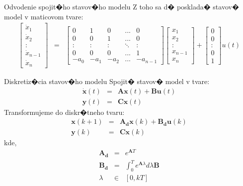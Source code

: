\documentclass{beamer}
\renewcommand{\vec}[1]{\boldsymbol{#1}} %
\begin{document}
\begin{frame}{Odvodenie spojit�ho stavov�ho modelu}
Z toho sa d� posklada� stavov� model v maticovom tvare:
\begin{eqnarray*}
\begin{bmatrix}
\dot{x}_{1}\\\dot{x}_{2}\\\colon \\ \dot{x}_{n-1}\\ \dot{x}_{n}
\end{bmatrix}
&=&
\begin{bmatrix}
0 & 1 & 0 & ... &  0 \\
0 & 0 & 1 & ... &  0 \\
\colon & \colon & \colon & \ddots & \colon\\
0 & 0 & 0 & ... & 1 \\
-a_{0} & -a_{1} & -a_{2} & ... & -a_{n-1}
\end{bmatrix}
\begin{bmatrix}
x_{1}\\x_{2}\\\colon\\x_{n-1}\\x_{n}
\end{bmatrix}
+
\begin{bmatrix}
0\\ 0\\ \colon \\ 0\\ 1
\end{bmatrix}
u(t)
\end{eqnarray*}
\end{frame}

\begin{frame}{Diskretiz�cia stavov�ho modelu}
Spojit� stavov� model v tvare:
\begin{eqnarray*}
\vec{\dot{x}}(t)&=& \vec{A}\vec{x}(t)+\vec{B} \vec{u}(t)\\
\vec{y}(t) &=& \vec{C}\vec{x}(t)
\end{eqnarray*}
Transformujeme do diskr�tneho tvaru:
\begin{eqnarray*}
\vec{x}(k+1)&=& \vec{A_{d}}\vec{x}(k)+\vec{B_{d}} \vec{u}(k)\\
\vec{y}(k) &=& \vec{C}\vec{x}(k)
\end{eqnarray*}
kde,
\begin{eqnarray*}
\vec{A_{d}}&=&e^{\vec{A}T}\\
\vec{B_{d}}&=&\int^{T}_{0}e^{\vec{A}\lambda}d\lambda\vec{B}\\
\lambda&\in&[0,kT]
\end{eqnarray*}
\end{frame}
\end{document}
